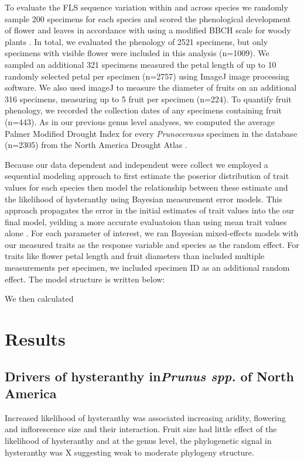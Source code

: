 \documentclass{article}\usepackage[]{graphicx}\usepackage[]{color}
\begin{document}
\noindent To evaluate the FLS sequence variation within and across species we randomly sample 200 specimens for each species and scored the phenological development of flower and leaves in accordance with using a modified BBCH scale for woody plants \citep{Finn2007}. In total, we evaluated the phenology of 2521 specimens, but only specimens with visible flower were included in this analysis (n=1009). We sampled an additional 321 specimens measured the petal length of up to 10 randomly selected petal per specimen (n=2757) using ImageJ image processing software. We also used imageJ to measure the diameter of fruits on an additional 316 specimens, measuring up to 5 fruit per specimen (n=224). To quantify fruit phenology, we recorded the collection dates of any specimens containing fruit (n=443). As in our previous genus level analyses, we computed the average Palmer Modified Drought Index for every \textit{Prunocerasus} specimen in the database (n=2305) from the North America Drought Atlas \citep{}.

\noindent Because our data dependent and independent were collect we employed a sequential modeling approach to first estimate the poserior distribution of trait values for each species then model the relationship between these estimate and the likelihood of hysteranthy using Bayesian measurement error models. This approach propagates the error in the initial estimates of trait values into the our final model, yeilding a more accurate evaluatoion than using mean trait values alone \citep{}. For each parameter of interest, we ran Bayesian mixed-effects models with our measured traits as the response variable and species as the random effect. For traits like flower petal length and fruit diameters than included multiple measurements per specimen, we included specimen ID as an additional random effect. The model structure is written below:

\noindent We then calculated 


\section*{Results}
\subsection*{Drivers of hysteranthy in\textit{Prunus spp.} of North America}
Increased likelihood of hysteranthy was associated increasing aridity, flowering and inflorescence size and their interaction. Fruit size had little effect of the likelihood of hysteranthy and at the genus level, the phylogenetic signal in hysteranthy was X suggesting weak to moderate phylogeny structure.
\end{document}
